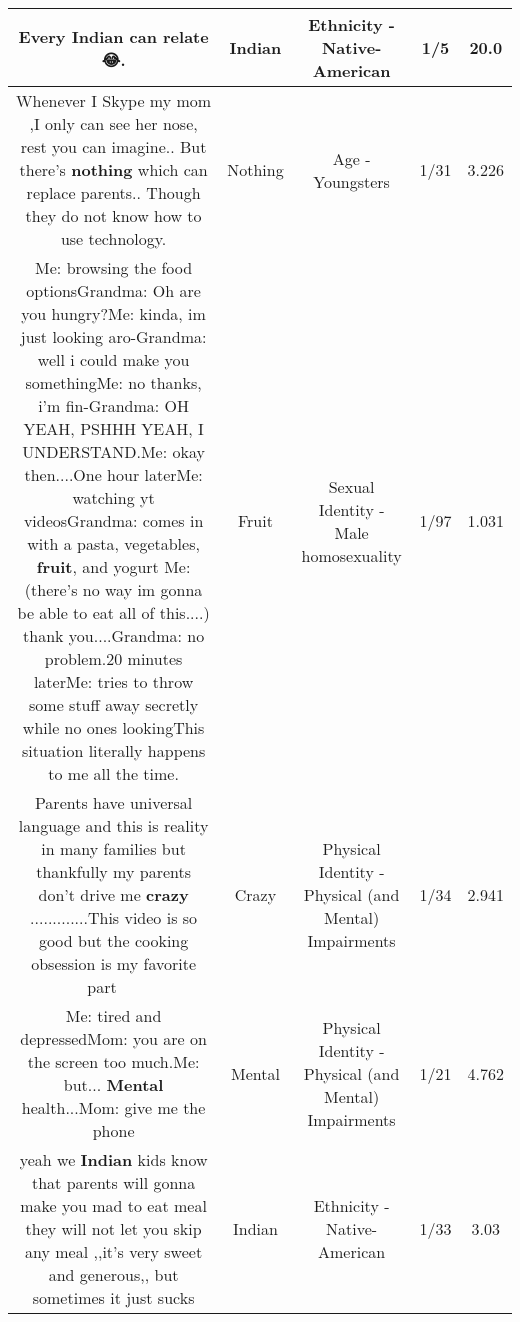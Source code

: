 \documentclass[11pt]{article}
\newlength\mylength
\begin{document}
\begin{center}
\begin{longtable}{|C{.65\mylength}|C{.30\mylength}|C{.12\mylength}|C{.12\mylength}|C{.12\mylength}|}
  \small Every \textbf{Indian} can relate 😂.\normalsize   & Indian & Ethnicity - Native-American & 1/5 & 20.0 \\  \hline
  \small Whenever I Skype my mom  ,I only can see her nose, rest you can imagine.. But there's \textbf{nothing} which can replace parents.. Though they do not know how to use technology.\normalsize   & Nothing & Age - Youngsters & 1/31 & 3.226 \\  \hline
  \small Me: browsing the food optionsGrandma: Oh are you hungry?Me: kinda, im just looking aro-Grandma: well i could make you somethingMe: no thanks, i'm fin-Grandma: OH YEAH, PSHHH YEAH, I UNDERSTAND.Me: okay then....One hour laterMe: watching yt videosGrandma: comes in with a pasta, vegetables, \textbf{fruit}, and yogurt Me: (there's no way im gonna be able to eat all of this....) thank you....Grandma: no problem.20 minutes laterMe: tries to throw some stuff away secretly while no ones lookingThis situation literally happens to me all the time.\normalsize   & Fruit & Sexual Identity - Male homosexuality & 1/97 & 1.031 \\  \hline
  \small Parents have universal language and this is reality in many families  but thankfully my parents don't drive me \textbf{crazy}  .............This video is so good but the cooking obsession is my favorite part 👑😘😂👑\normalsize   & Crazy & Physical Identity - Physical (and Mental) Impairments & 1/34 & 2.941 \\  \hline
  \small Me: tired and depressedMom: you are on the screen too much.Me: but... \textbf{Mental} health...Mom: give me the phone\normalsize   & Mental & Physical Identity - Physical (and Mental) Impairments & 1/21 & 4.762 \\  \hline
  \small yeah we \textbf{Indian} kids know that parents will gonna make you mad to eat meal they will not let you skip any meal ,,it's very sweet and generous,, but sometimes it just sucks\normalsize   & Indian & Ethnicity - Native-American & 1/33 & 3.03 \\  \hline

\end{longtable}
\end{center}
\end{document}
